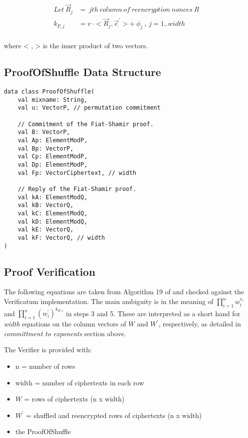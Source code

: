 \documentclass{article}
\begin{document}
\begin{align*}
Let\ \vec{R}_{j} & =\ jth\ column\ of\ reencryption\ nonces\ R\\
k_{F,j} & =v\ \cdot<\vec{R}_{j},\vec{e}^{\prime}>+\ \phi_{j}\ ,\ j=1..width\\
\end{align*}

where < , > is the inner product of two vectors.

\subsection{ProofOfShuffle Data Structure}
\begin{verbatim}
data class ProofOfShuffle(
    val mixname: String,
    val u: VectorP, // permutation commitment

    // Commitment of the Fiat-Shamir proof.
    val B: VectorP, 
    val Ap: ElementModP, 
    val Bp: VectorP, 
    val Cp: ElementModP, 
    val Dp: ElementModP, 
    val Fp: VectorCiphertext, // width

    // Reply of the Fiat-Shamir proof.
    val kA: ElementModQ,
    val kB: VectorQ,
    val kC: ElementModQ,
    val kD: ElementModQ,
    val kE: VectorQ,
    val kF: VectorQ, // width
)
\end{verbatim}

\subsection{Proof Verification}

The following equations are taken from Algorithm 19 of \cite{Wikstr22} and
checked against the Verificatum implementation. The main ambiguity
is in the meaning of $\prod_{i=1}^{n}w_{i}^{e_{i}}$ and $\prod_{i=1}^{n}(w_{i}^{\prime})^{k_{E,i}}$
in steps 3 and 5. These are interpreted as a short hand for \emph{width}
equations on the column vectors of $W$ and $W^{\prime}$, respectively,
as detailed in \emph{committment to exponents} section above.

The Verifier is provided with:

\begin{itemize}
\item n = number of rows 
\item width = number of ciphertexts in each row 
\item $W$ = rows of ciphertexts (n x width) 
\item $W^{\prime}$ = shuffled and reencrypted rows of ciphertexts (n x width) 
\item the ProofOfShuffle 
\end{itemize}
\end{document}
